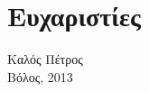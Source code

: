 ﻿\thispagestyle{plain}
\chapter*{Ευχαριστίες}
\begin{wbepi}{Καλός Πέτρος\\ Βόλος, 2013}
\end{wbepi} 
